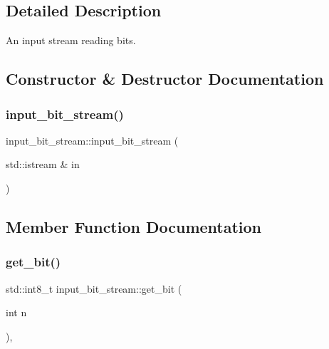 \subsection{Detailed Description}
An input stream reading bits. 

\subsection{Constructor \& Destructor Documentation}
\mbox{\label{classinput__bit__stream_af03beded61deb6ba4b28ef3ec1c07e7a}} 
\subsubsection{\texorpdfstring{input\+\_\+bit\+\_\+stream()}{input\_bit\_stream()}}
{\footnotesize\ttfamily input\+\_\+bit\+\_\+stream\+::input\+\_\+bit\+\_\+stream (\begin{DoxyParamCaption}\item[{std\+::istream \&}]{in }\end{DoxyParamCaption})\hspace{0.3cm}{\ttfamily [inline]}}



\subsection{Member Function Documentation}
\mbox{\label{classinput__bit__stream_a71ef59dca0ee93ab4efe5594689b40c7}} 
\subsubsection{\texorpdfstring{get\+\_\+bit()}{get\_bit()}}
{\footnotesize\ttfamily std\+::int8\+\_\+t input\+\_\+bit\+\_\+stream\+::get\+\_\+bit (\begin{DoxyParamCaption}\item[{int}]{n }\end{DoxyParamCaption})\hspace{0.3cm}{\ttfamily [inline]}, {\ttfamily [protected]}}

